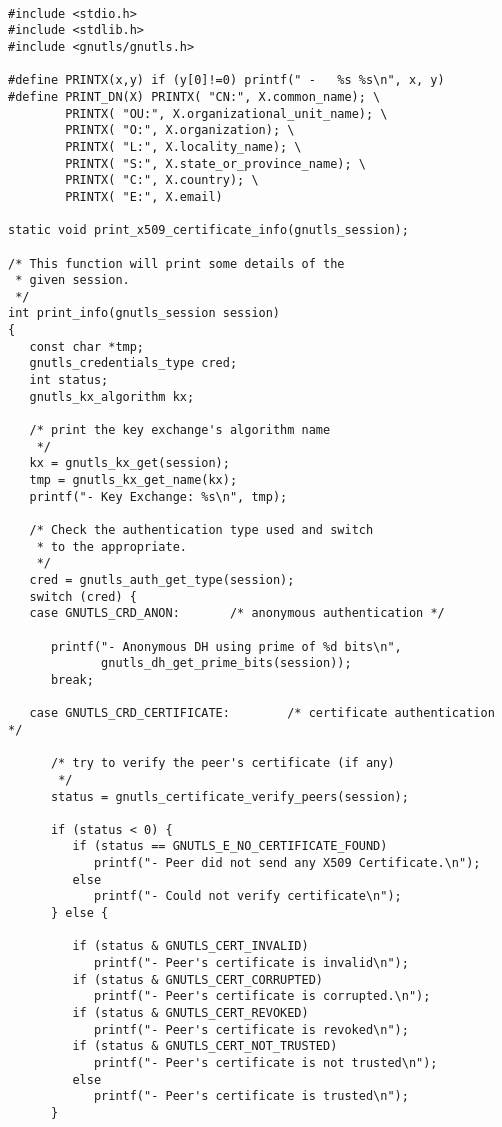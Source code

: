 \begin{verbatim}

#include <stdio.h>
#include <stdlib.h>
#include <gnutls/gnutls.h>

#define PRINTX(x,y) if (y[0]!=0) printf(" -   %s %s\n", x, y)
#define PRINT_DN(X) PRINTX( "CN:", X.common_name); \
        PRINTX( "OU:", X.organizational_unit_name); \
        PRINTX( "O:", X.organization); \
        PRINTX( "L:", X.locality_name); \
        PRINTX( "S:", X.state_or_province_name); \
        PRINTX( "C:", X.country); \
        PRINTX( "E:", X.email)

static void print_x509_certificate_info(gnutls_session);

/* This function will print some details of the
 * given session.
 */
int print_info(gnutls_session session)
{
   const char *tmp;
   gnutls_credentials_type cred;
   int status;
   gnutls_kx_algorithm kx;

   /* print the key exchange's algorithm name
    */
   kx = gnutls_kx_get(session);
   tmp = gnutls_kx_get_name(kx);
   printf("- Key Exchange: %s\n", tmp);

   /* Check the authentication type used and switch
    * to the appropriate.
    */
   cred = gnutls_auth_get_type(session);
   switch (cred) {
   case GNUTLS_CRD_ANON:       /* anonymous authentication */

      printf("- Anonymous DH using prime of %d bits\n",
             gnutls_dh_get_prime_bits(session));
      break;

   case GNUTLS_CRD_CERTIFICATE:        /* certificate authentication */

      /* try to verify the peer's certificate (if any)
       */
      status = gnutls_certificate_verify_peers(session);

      if (status < 0) {
         if (status == GNUTLS_E_NO_CERTIFICATE_FOUND)
            printf("- Peer did not send any X509 Certificate.\n");
         else
            printf("- Could not verify certificate\n");
      } else {

         if (status & GNUTLS_CERT_INVALID)
            printf("- Peer's certificate is invalid\n");
         if (status & GNUTLS_CERT_CORRUPTED)
            printf("- Peer's certificate is corrupted.\n");
         if (status & GNUTLS_CERT_REVOKED)
            printf("- Peer's certificate is revoked\n");
         if (status & GNUTLS_CERT_NOT_TRUSTED)
            printf("- Peer's certificate is not trusted\n");
         else
            printf("- Peer's certificate is trusted\n");
      }


\end{verbatim}
